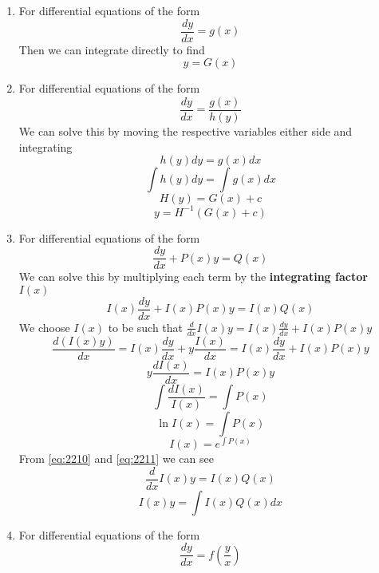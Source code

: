 \documentclass[11pt,titlepage]{article}
\numberwithin{equation}{subsection}
\begin{document}
\begin{enumerate}
    \item For differential equations of the form
    \begin{equation}
        \frac{dy}{dx}=g(x)
    \end{equation}
    Then we can integrate directly to find 
    \begin{equation}
        y=G(x)
    \end{equation}
    \item For differential equations of the form
    \begin{equation}
        \frac{dy}{dx}=\frac{g(x)}{h(y)}
    \end{equation}
    We can solve this by moving the respective variables either side and integrating
    \begin{equation}
        h(y) dy=g(x)dx
    \end{equation}
    \begin{equation}
        \int h(y)dy=\int g(x) dx
    \end{equation}
    \begin{equation}
        H(y)=G(x)+c
    \end{equation}
    \begin{equation}
        y=H^{-1}(G(x)+c)
    \end{equation}
\item For differential equations of the form
\begin{equation}
    \frac{dy}{dx}+P(x)y=Q(x)
\end{equation}
We can solve this by multiplying each term by the \textbf{integrating factor} $I(x)$
\begin{equation}\label{eq:2210}
    I(x)\frac{dy}{dx}+I(x)P(x)y=I(x)Q(x)
\end{equation}
We choose $I(x)$ to be such that $\frac{d}{dx}I(x)y=I(x)\frac{dy}{dx}+I(x)P(x)y$
\begin{equation}\label{eq:2211}
    \frac{d(I(x)y)}{dx}=I(x)\frac{dy}{dx}+y\frac{I(x)}{dx}=I(x)\frac{dy}{dx}+I(x)P(x)y
\end{equation}
\begin{equation}
    y\frac{dI(x)}{dx}=I(x)P(x)y
\end{equation}
\begin{equation}
    \int \frac{dI(x)}{I(x)}=\int P(x)
\end{equation}
\begin{equation}
    \ln I(x)=\int P(x)
\end{equation}
\begin{equation}
    I(x)=e^{\int P(x)}
\end{equation}
From \eqref{eq:2210} and \eqref{eq:2211} we can see
\begin{equation}
    \frac{d}{dx}I(x)y=I(x)Q(x)
\end{equation}
\begin{equation}
    I(x)y=\int I(x)Q(x)dx
\end{equation}
\item For differential equations of the form 
\begin{equation}
    \frac{dy}{dx}=f\left(\frac{y}{x}\right)
\end{equation}
\end{enumerate}
\end{document}
